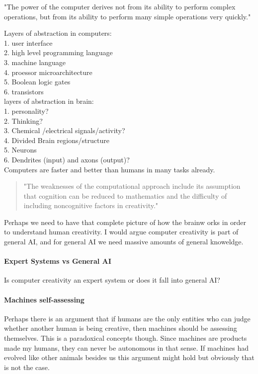 "The power of the computer derives not from its ability to perform complex operations, but from its ability to perform many simple operations very quickly."

Layers of abstraction in computers:\\
1.	user interface\\
2.	high level programming language\\
3.	machine language\\
4.	proessor microarchitecture\\
5.	Boolean logic gates\\
6.	transistors\\

layers of abstraction in brain:\\
1.	personality?\\
2.	Thinking?\\
3.	Chemical /electrical signals/activity?\\
4.	Divided Brain regions/structure\\
5.	Neurons\\
6.	Dendrites (input) and axons (output)?\\


Computers are faster and better than humans in many tasks already.

\begin{quote}
"The weaknesses of the computational approach include its assumption that cognition can be reduced to mathematics and the difficulty of including noncognitive factors in creativity." \autocite[p.457]{Mayer1999}
\end{quote}


Perhaps we need to have that complete picture of how the brainw orks in order to understand human creativity. I would argue computer creativity is part of general \ac{AI}, and for general \ac{AI} we need massive amounts of general knoweldge.
\paragraph{Expert Systems vs General AI}
Is computer creativity an expert system or does it fall into general \ac{AI}? 

\paragraph{Machines self-assessing}
Perhaps there is an argument that if humans are the only entities who can judge whether another human is being creative, then machines should be assessing themselves. This is a paradoxical concepts though. Since machines are products made my humans, they can never be autonomous in that sense. If machines had evolved like other animals besides us this argument might hold but obviously that is not the case.



